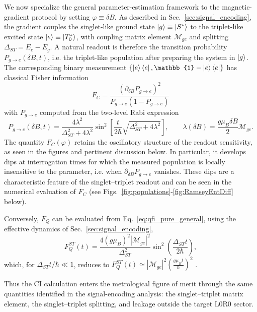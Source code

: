 \documentclass[fleqn,10pt]{wlscirep}
\begin{document}
We now specialize the general parameter-estimation framework to the magnetic-gradient
protocol by setting $\varphi\equiv\delta B$. 
As described in Sec.~\ref{sec:signal_encoding}, the gradient couples the
singlet-like ground state $\ket{g} \equiv \ket{S^\ast}$ to the triplet-like excited state $\ket{e}\equiv \ket{T^\ast_0}$,
with coupling matrix element $\mathcal M_{ge}$ and splitting
$\Delta_{ST}=E_e-E_g$.  A natural readout is therefore the transition probability
$P_{g\to e}(\delta B,t)$, i.e. the triplet-like population after preparing the
system in $\ket{g}$.  The corresponding binary measurement
$\{\ket{e}\bra{e},\mathbb{1}-\ket{e}\bra{e}\}$ has classical Fisher information
\begin{equation}
  F_C
  =
  \frac{
  \left(\partial_{\delta B}P_{g\to e}\right)^2
  }{
  P_{g\to e}\left(1-P_{g\to e}\right)
  }
  \label{eq:binary_fisher}
\end{equation}
with $P_{g\to e}$ computed from the two-level Rabi expression
\begin{equation}
  P_{g\to e}(\delta B,t)
  =
  \frac{4\lambda^2}{\Delta_{ST}^2+4\lambda^2}
  \sin^2\!\left[
  \frac{t}{2\hbar}
  \sqrt{\Delta_{ST}^2+4\lambda^2}
  \right],
  \qquad
  \lambda(\delta B)
  =
  \frac{g\mu_B\delta B}{2}\mathcal M_{ge}.
  \label{eq:Pge_rabi_full}
\end{equation}
The quantity $F_C(\varphi)$ retains the oscillatory structure of the readout sensitivity, as seen in the figures and pertinent discussion below.
In particular, it develops dips at interrogation
times for which the measured population is locally insensitive to the parameter,
i.e. when $\partial_{\delta B}P_{g\to e}$ vanishes.  These dips are a characteristic feature of the  singlet--triplet readout and can be seen in the
numerical evaluation of $F_C$ (see Figs.~\ref{fig:populations}-\ref{fig:RamseyEntDiff} below).

Conversely, $F_Q$ can be evaluated from Eq.~\eqref{eq:qfi_pure_general}, using the effective dynamics of Sec.~\ref{sec:signal_encoding},
\begin{equation}
  F_Q^{ST}(t)
  =
  \frac{4(g\mu_B)^2|\mathcal M_{ge}|^2}{\Delta_{ST}^2}
  \sin^2\left(\frac{\Delta_{ST}t}{2\hbar}\right),
  \label{eq:FQ_ST_detuned}
\end{equation}
which, for $\Delta_{ST}t/\hbar\ll1$, reduces to $
  F_Q^{ST}(t)
  \simeq
  |\mathcal M_{ge}|^2
  \left(\frac{g\mu_B t}{\hbar}\right)^2$ .

Thus the CI calculation enters the metrological figure of merit through the same
quantities identified in the signal-encoding analysis: the singlet--triplet matrix
element, the singlet--triplet splitting, and leakage outside the target
$\mathrm{L0}\mathrm{R0}$ sector.
\end{document}
